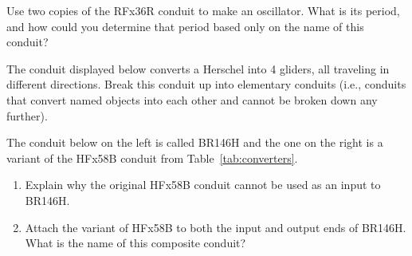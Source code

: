 \begin{multicols}{2}
	
	\mfilbreak
	
	
	\begin{problem}\label{exer:RFx36R_osc}
		Use two copies of the RFx36R conduit to make an oscillator. What is its period, and how could you determine that period based only on the name of this conduit?
	\end{problem}
	
	
	\mfilbreak
	
	
	\begin{problem}\label{exer:H_to_4G}
		The conduit displayed below converts a Herschel into 4 gliders, all traveling in different directions. Break this conduit up into elementary conduits (i.e., conduits that convert named objects into each other and cannot be broken down any further).
		
		\begin{center}
		\end{center}
		
	\end{problem}
	
	
	\mfilbreak
	
	
	\begin{problemstar}\label{exer:HFx58B_modify}
		The conduit below on the left is called BR146H and the one on the right is a variant of the HFx58B conduit from Table~\ref{tab:converters}.
		
		\begin{center}
			 \qquad {}
		\end{center}
		
		\begin{enumerate}[label=\bf\color{ocre}(\alph*)]
			\item Explain why the original HFx58B conduit cannot be used as an input to BR146H.
			
			\item Attach the variant of HFx58B to both the input and output ends of BR146H. What is the name of this composite conduit?
		\end{enumerate}
	\end{problemstar}
	
	
	\mfilbreak
	

\end{multicols}
